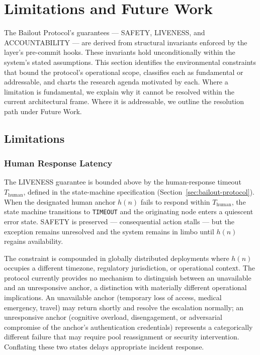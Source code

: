 \section{Limitations and Future Work}\label{sec:limitations}

The Bailout Protocol's guarantees --- SAFETY, LIVENESS, and ACCOUNTABILITY --- are derived from structural invariants enforced by the \fact{} layer's pre-commit hooks. These invariants hold unconditionally within the system's stated assumptions. This section identifies the environmental constraints that bound the protocol's operational scope, classifies each as fundamental or addressable, and charts the research agenda motivated by each. Where a limitation is fundamental, we explain why it cannot be resolved within the current architectural frame. Where it is addressable, we outline the resolution path under Future Work.

\subsection{Limitations}\label{sec:limitations:items}

\subsubsection{Human Response Latency}
\label{sec:lim:latency}

The LIVENESS guarantee is bounded above by the human-response timeout $T_{\text{human}}$, defined in the state-machine specification (Section~\ref{sec:bailout-protocol}). When the designated human anchor $h(n)$ fails to respond within $T_{\text{human}}$, the state machine transitions to \texttt{TIMEOUT} and the originating node enters a quiescent error state. SAFETY is preserved --- consequential action stalls --- but the exception remains unresolved and the system remains in limbo until $h(n)$ regains availability.

The constraint is compounded in globally distributed deployments where $h(n)$ occupies a different timezone, regulatory jurisdiction, or operational context. The protocol currently provides no mechanism to distinguish between an unavailable and an unresponsive anchor, a distinction with materially different operational implications. An unavailable anchor (temporary loss of access, medical emergency, travel) may return shortly and resolve the escalation normally; an unresponsive anchor (cognitive overload, disengagement, or adversarial compromise of the anchor's authentication credentials) represents a categorically different failure that may require pool reassignment or security intervention. Conflating these two states delays appropriate incident response.

